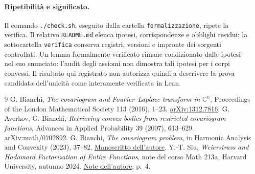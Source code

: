 \documentclass[11pt,a4paper]{article}
\theoremstyle{remark}
\begin{document}
\paragraph{Ripetibilità e significato.}
Il comando \texttt{./check.sh}, eseguito dalla cartella
\texttt{formalizzazione}, ripete la verifica. Il relativo
\texttt{README.md} elenca ipotesi, corrispondenze e obblighi
residui; la sottocartella \texttt{verifica} conserva registri,
versioni e impronte dei sorgenti controllati.
Un lemma formalmente verificato rimane condizionato dalle ipotesi
nel suo enunciato: l'audit degli assiomi non dimostra tali ipotesi
per i corpi convessi. Il risultato qui registrato non autorizza
quindi a descrivere la prova candidata dell'unicità come
interamente verificata in Lean.

\begin{thebibliography}{9}
 G. Bianchi,
\emph{The covariogram and Fourier--Laplace transform in $\mathbb C^n$},
Proceedings of the London Mathematical Society 113 (2016), 1--23.
\href{https://arxiv.org/abs/1312.7816}{arXiv:1312.7816}.
 G. Averkov, G. Bianchi,
\emph{Retrieving convex bodies from restricted covariogram functions},
Advances in Applied Probability 39 (2007), 613--629.
\href{https://arxiv.org/abs/math/0702892}{arXiv:math/0702892}.
 G. Bianchi, \emph{The covariogram problem},
in Harmonic Analysis and Convexity (2023), 37--82.
\href{https://people.dimai.unifi.it/bianchi/lavori/covariogram_survey14.pdf}{Manoscritto dell'autore}.
 Y.-T. Siu,
\emph{Weierstrass and Hadamard Factorization of Entire Functions},
note del corso Math 213a, Harvard University, autunno 2024.
\href{https://people.math.harvard.edu/~siu/math213a/weierstrass_and_hadamard_factorization_of_entire_function.pdf}{Note dell'autore}, p.~4.
\end{thebibliography}
\end{document}
